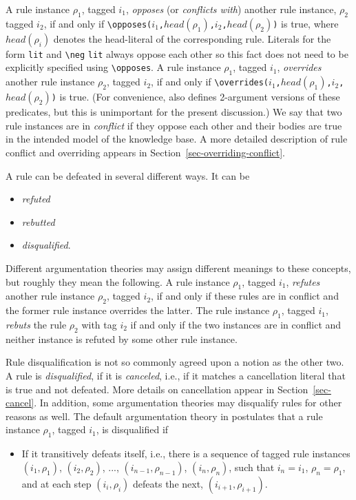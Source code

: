 \documentclass[11pt]{article}
\newcommand{\ERGO}{\mbox{\smaller{\ensuremath{\cal{E}}\smaller{{\sc{RGO}}}}}\xspace}
\newcommand{\FLSYSTEM}{\ERGO}
\newcommand{\bs}{\textbackslash}
\newcommand{\RULELOGNEG}{{\texttt{{\bs}neg}}\xspace}
\begin{document}
A rule instance $\rho_1$, tagged $i_1$, \emph{opposes}
(or \emph{conflicts with})  another rule
instance, $\rho_2$ tagged $i_2$, if and only if
\texttt{\bs{}opposes($i_1$,$head(\rho_1)$,$i_2$,$head(\rho_2)$)} is true,
where $head(\rho_i)$ denotes the head-literal of the corresponding rule.
Literals for the form \texttt{lit} and \texttt{\RULELOGNEG}  \texttt{lit} always oppose 
each other so this fact does not need to be explicitly specified using
\texttt{\bs{}opposes}.   
A rule instance $\rho_1$, tagged
$i_1$, \emph{overrides} another rule instance $\rho_2$, tagged $i_2$, if and
only if \texttt{\bs{}overrides($i_1$,$head(\rho_1)$,$i_2$,$head(\rho_2)$)} is
true. (For convenience, \FLSYSTEM also defines 2-argument versions of these
predicates, but this is unimportant for the present discussion.)
We say that two rule instances are in \emph{conflict} if they oppose each other
and their bodies are true in the intended model of the knowledge base.
A more detailed description of rule conflict and overriding appears in
Section~\ref{sec-overriding-conflict}.

A rule can be defeated in several different ways. It can be
\begin{itemize}
\item  \emph{refuted}
\item  \emph{rebutted} 
\item  \emph{disqualified}. 
\end{itemize}
Different argumentation theories may assign different meanings to these
concepts, but roughly they mean the following. A rule instance $\rho_1$,
tagged $i_1$, \emph{refutes} another rule instance $\rho_2$, tagged $i_2$, 
if and only if these rules are in conflict and the former rule instance
overrides the latter. The rule instance $\rho_1$,
tagged $i_1$, \emph{rebuts} the rule $\rho_2$ with tag $i_2$ if and only if the two
instances are in conflict and neither instance is refuted by some other
rule instance.

Rule disqualification is not so commonly agreed upon a notion as the other
two.  A rule is \emph{disqualified}, if it is \emph{canceled}, i.e., 
if it matches a
cancellation literal that is true and not defeated.  More details on
cancellation appear in Section~\ref{sec-cancel}. In addition, some
argumentation theories may disqualify rules for other reasons as well.
The default argumentation theory in \FLSYSTEM postulates that a
rule instance $\rho_1$, tagged $i_1$, is disqualified if
\begin{itemize}
\item If it transitively defeats itself, i.e., there is a sequence of
  tagged rule instances $(i_1,\rho_1)$, $(i_2,\rho_2)$, ...,
  $(i_{n-1},\rho_{n-1})$, $(i_n,\rho_n)$, such that $i_n=i_1$,
  $\rho_n=\rho_1$, and at each step $(i_i,\rho_i)$ defeats the next,
  $(i_{i+1},\rho_{i+1})$.
\end{itemize}
\end{document}
